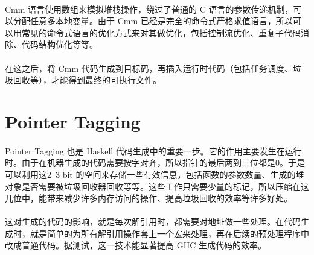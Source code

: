 \documentclass{article}
\begin{document}
	\paragraph{}
	Cmm 语言使用数组来模拟堆栈操作，绕过了普通的 C 语言的参数传递机制，可以分配任意多本地变量。由于 Cmm 已经是完全的命令式严格求值语言，所以可以用常见的命令式语言的优化方式来对其做优化，包括控制流优化、重复子代码消除、代码结构优化等等。
	\paragraph{}
	在这之后，将 Cmm 代码生成到目标码，再插入运行时代码（包括任务调度、垃圾回收等），才能得到最终的可执行文件。
	\section{Pointer Tagging\cite{faster-laziness-using-dynamic-pointer-tagging}}
	\paragraph{}
	Pointer Tagging 也是 Haskell 代码生成中的重要一步。它的作用主要发生在运行时。由于在机器生成的代码需要按字对齐，所以指针的最后两到三位都是0。于是可以利用这2~3 bit 的空间来存储一些有效信息，包括函数的参数数量、生成的堆对象是否需要被垃圾回收器回收等等。这些工作只需要少量的标记，所以压缩在这几位中，能带来减少许多内存访问的操作、提高垃圾回收的效率等许多好处。
	\paragraph{}
	这对生成的代码的影响，就是每次解引用时，都需要对地址做一些处理。在代码生成时，就是简单的为所有解引用操作套上一个宏来处理，再在后续的预处理程序中改成普通代码。据测试，这一技术能显著提高 GHC 生成代码的效率。
	\medskip
	
	
\end{document}
